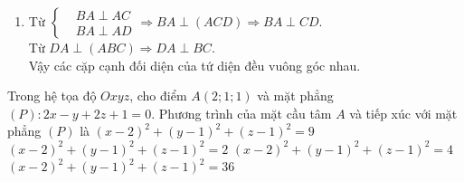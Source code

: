 \begin{ex}
{\begin{enumerate}[(1).]
{}
			Từ $\left \{\begin{aligned}
			&BA \perp AC \\
			&BA \perp AD
			\end{aligned} \right. \Rightarrow BA \perp (ACD) \Rightarrow BA \perp CD \Rightarrow CD \perp AB$. \\
			Từ $AH \perp (ABC) \Rightarrow AH \perp CD$, từ $\left \{\begin{aligned}
			&CD \perp AB \\
			&CD \perp AH
			\end{aligned} \right. \Rightarrow CD \perp (ABH) \Rightarrow CD \perp BH(2)$\\
			Từ $(1)$ và $(2)$ ta được $H$ là trực tâm của $\triangle ABC$.
			\item Từ $\left \{\begin{aligned}
			&BA \perp AC \\
			&BA \perp AD
			\end{aligned} \right. \Rightarrow BA \perp (ACD) \Rightarrow BA \perp CD$. \\
			Từ $DA \perp (ABC) \Rightarrow DA \perp BC$.\\
			Vậy các cặp cạnh đối diện của tứ diện đều vuông góc nhau.
		\end{enumerate}	
	}
\end{ex}
\begin{ex}%
	Trong hệ tọa độ $Oxyz$, cho điểm $A(2;1;1)$ và mặt phẳng $(P):2x-y+2z+1=0$. Phương trình của mặt cầu tâm $A$ và tiếp xúc với mặt phẳng $(P)$ là
	\choice
	{$(x-2)^2+(y-1)^2+(z-1)^2=9$}
	{$(x-2)^2+(y-1)^2+(z-1)^2=2$}
	{\True $(x-2)^2+(y-1)^2+(z-1)^2=4$}
	{$(x-2)^2+(y-1)^2+(z-1)^2=36$}
\end{ex}
